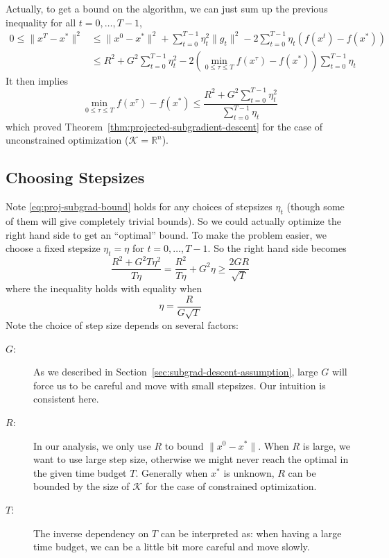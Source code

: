 \documentclass{scrartcl}
\newcommand{\RR}{\mathbb{R}}
\newcommand{\sK}{\mathcal{K}}
\begin{document}
Actually, to get a bound on the algorithm, we can just sum up the previous inequality for all
$t=0,\ldots,T-1$,
\[
  \begin{aligned}
    0\leq\|x^T-x^*\|^2
    &\leq \|x^0-x^*\|^2 + \sum_{t=0}^{T-1}\eta_t^2\|g_t\|^2 - 2\sum_{t=0}^{T-1}\eta_t \left(f(x^t)-f
    (x^*)\right) \\
    &\leq R^2 + G^2\sum_{t=0}^{T-1}\eta_t^2 -2\left(\min_{0\leq\tau\leq T}f(x^\tau) - f
    (x^*)\right)\sum_{t=0}^{T-1}\eta_t
  \end{aligned}
\]
It then implies
\begin{equation}
\min_{0\leq\tau\leq T}f(x^\tau) - f(x^*) \leq \frac{R^2 + G^2\sum_{t=0}^{T-1}\eta_t^2}{\sum_{t=0}^
{T-1}\eta_t}
\end{equation}
which proved Theorem~\ref{thm:projected-subgradient-descent} for the case of unconstrained
optimization ($\sK=\RR^n$).

\subsection{Choosing Stepsizes}

Note \eqref{eq:proj-subgrad-bound} holds for any choices of stepsizes $\eta_t$ (though some of them
will give completely trivial bounds). So we could actually optimize the right hand side to get an
``optimal'' bound. To make the problem easier, we choose a fixed stepsize $\eta_t=\eta$ for
$t=0,\ldots,T-1$. So the right hand side becomes
\begin{equation}
  \frac{R^2+G^2T\eta^2}{T\eta} = \frac{R^2}{T\eta} + G^2\eta \geq \frac{2GR}{\sqrt{T}}
  \label{eq:subgrad-bound-fix-eta}
\end{equation}
where the inequality holds with equality when
\begin{equation}
  \eta = \frac{R}{G\sqrt{T}}
\end{equation}
Note the choice of step size depends on several factors:
\begin{description}
  \item[$G$:] As we described in Section~\ref{sec:subgrad-descent-assumption}, large $G$ will force
  us to be careful and move with small stepsizes. Our intuition is consistent here.
  \item[$R$:] In our analysis, we only use $R$ to bound $\|x^0-x^*\|$. When $R$ is large, we want to
  use large step size, otherwise we might never reach the optimal in the given time budget $T$.
  Generally when $x^*$ is unknown, $R$ can be bounded by the size of $\sK$ for the case
  of constrained optimization.
  \item[$T$:] The inverse dependency on $T$ can be interpreted as: when having a large time budget,
  we can be a little bit more careful and move slowly.
\end{description}
\end{document}
